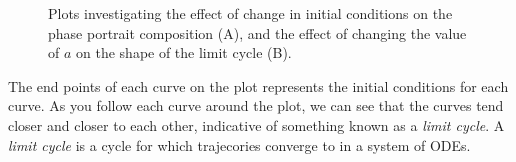 \documentclass[11pt,a4paper]{amsart}
\begin{document}
\begin{figure}[h]
\caption{Plots investigating the effect of change in initial conditions on the phase portrait composition (A), and the effect of changing the value of $a$ on the shape of the limit cycle (B).}
\centering
{}
	\hfill
{}
\end{figure}

The end points of each curve on the plot represents the initial conditions for each curve. As you follow each curve around the plot, we can see that the curves tend closer and closer to each other, indicative of something known as a \textit{limit cycle}. A \textit{limit cycle} is a cycle for which trajecories converge to in a system of ODEs.
\end{document}
